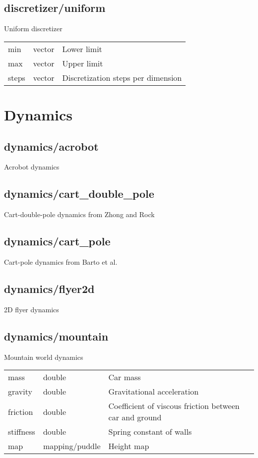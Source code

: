 \subsection{discretizer/uniform}
\noindent Uniform discretizer\\

\noindent\begin{tabular}{@{}lll@{}}
min&vector&Lower limit\\
max&vector&Upper limit\\
steps&vector&Discretization steps per dimension\\
\end{tabular}
\section{Dynamics}
\subsection{dynamics/acrobot}
\noindent Acrobot dynamics\\

\subsection{dynamics/cart\_double\_pole}
\noindent Cart-double-pole dynamics from Zhong and Rock\\

\subsection{dynamics/cart\_pole}
\noindent Cart-pole dynamics from Barto et al.\\

\subsection{dynamics/flyer2d}
\noindent 2D flyer dynamics\\

\subsection{dynamics/mountain}
\noindent Mountain world dynamics\\

\noindent\begin{tabular}{@{}lll@{}}
mass&double&Car mass\\
gravity&double&Gravitational acceleration\\
friction&double&Coefficient of viscous friction between car and ground\\
stiffness&double&Spring constant of walls\\
map&mapping/puddle&Height map\\
\end{tabular}
